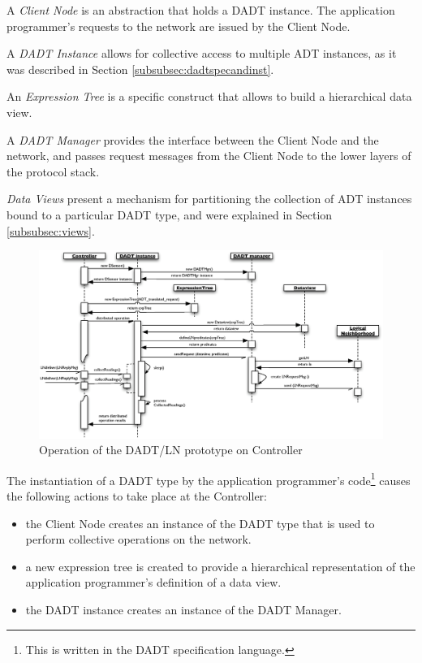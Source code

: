A \emph{Client Node} is an abstraction that holds a DADT
instance. The application programmer's requests to the network are issued
by the Client Node.
  
A \emph{DADT Instance} allows for collective access to multiple ADT instances,
as it was described in Section \ref{subsubsec:dadtspecandinst}.

An \emph{Expression Tree} is a specific construct that allows to build a
hierarchical data view.

A \emph{DADT Manager} provides the interface between the Client Node and the
network, and passes request messages from the Client Node to the lower layers
of the protocol stack.

\emph{Data Views} present a mechanism for partitioning the collection of
ADT instances bound to a particular DADT type, and were explained in Section
\ref{subsubsec:views}.

\begin{figure}
\centering
\includegraphics[width=\textwidth]{img/SeqDiagram_PCnode.eps}
\caption[Operation of the DADT/LN prototype on Controller]{Operation of the DADT/LN prototype on Controller}
\label{Fig:SeqDiagram_PCnode}
\end{figure}

The instantiation of a DADT type by the application programmer's
code\footnote{This is written in the DADT specification language.} causes the
following actions to take place at the Controller:
\begin{itemize}
 \item the Client Node creates an instance of the DADT type that is used to
  perform collective operations on the network.   
  \item a new expression tree
  is created to provide a hierarchical representation of the application programmer's definition of a data view.
  \item the DADT instance creates an instance of the DADT Manager.
\end{itemize}

